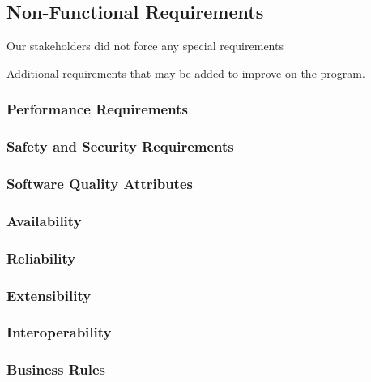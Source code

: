 \subsection{Non-Functional Requirements}
Our stakeholders did not force any special requirements

Additional requirements that may be added to improve on the program.
\subsubsection{Performance Requirements}
\subsubsection{Safety and Security Requirements}
\subsubsection{Software Quality Attributes}
\subsubsection{Availability}
\subsubsection{Reliability}
\subsubsection{Extensibility}
\subsubsection{Interoperability}
\subsubsection{Business Rules}